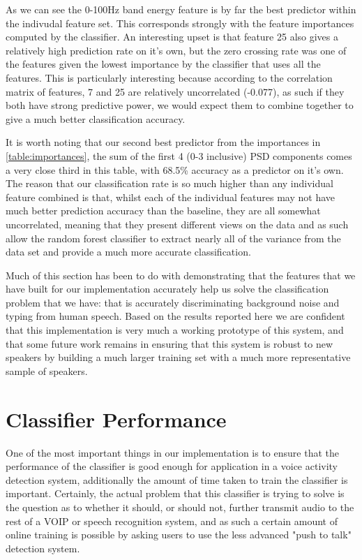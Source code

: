 \documentclass[ %
                    author={Sam Phippen},
                supervisor={Dr. Rafal Bogacz},
                     title={Real time voice activity detectors in noisy personal computing environments},
                  subtitle={},
                    degree={MEng},
                      year={2012} ]{thesis}
\begin{document}
As we can see the 0-100Hz band energy feature is by far the best predictor
within the indivudal feature set. This corresponds strongly with the feature
importances computed by the classifier. An interesting upset is that feature 25
also gives a relatively high prediction rate on it's own, but the zero crossing
rate was one of the features given the lowest importance by the classifier that
uses all the features. This is particularly interesting because according to
the correlation matrix of features, 7 and 25 are relatively uncorrelated
(-0.077), as such if they both have strong predictive power, we would expect them
to combine together to give a much better classification accuracy.

It is worth noting that our second best predictor from the importances in
\ref{table:importances}, the sum of the first 4 (0-3 inclusive) PSD components
comes a very close third in this table, with 68.5\% accuracy as a predictor on
it's own. The reason that our classification rate is so much higher than any
individual feature combined is that, whilst each of the individual features may
not have much better prediction accuracy than the baseline, they are all
somewhat uncorrelated, meaning that they present different views on the data
and as such allow the random forest classifier to extract nearly all of the
variance from the data set and provide a much more accurate classification.

Much of this section has been to do with demonstrating that the features that
we have built for our implementation accurately help us solve the
classification problem that we have: that is accurately discriminating
background noise and typing from human speech. Based on the results reported
here we are confident that this implementation is very much a working prototype
of this system, and that some future work remains in ensuring that this system
is robust to new speakers by building a much larger training set with a much
more representative sample of speakers.

\section{Classifier Performance}

One of the most important things in our implementation is to ensure that the
performance of the classifier is good enough for application in a voice activity
detection system, additionally the amount of time taken to train the classifier
is important. Certainly, the actual problem that this classifier is trying to
solve is the question as to whether it should, or should not, further transmit
audio to the rest of a VOIP or speech recognition system, and as such a certain
amount of online training is possible by asking users to use the less advanced
"push to talk" detection system.
\end{document}
